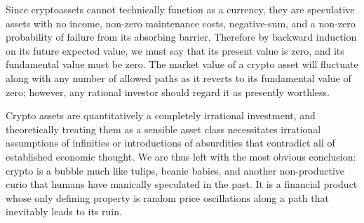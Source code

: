 
Since cryptoassets cannot technically function as a currency, they are
speculative assets with no income, non-zero maintenance costs, negative-sum, and
a non-zero probability of failure from its absorbing barrier. Therefore by
backward induction on its future expected value, we must say that its present
value is zero, and its fundamental value must be zero. The market value of a
crypto asset will fluctuate along with any number of allowed paths as it reverts
to its fundamental value of zero; however, any rational investor should regard
it as presently worthless.


Crypto assets are quantitatively a completely irrational investment, and
theoretically treating them as a sensible asset class necessitates irrational
assumptions of infinities or introductions of absurdities that contradict all of
established economic thought. We are thus left with the most obvious conclusion:
crypto is a bubble much like tulips, beanie babies, and another non-productive
curio that humans have manically speculated in the past. It is a financial
product whose only defining property is random price oscillations along a path
that inevitably leads to its ruin.
